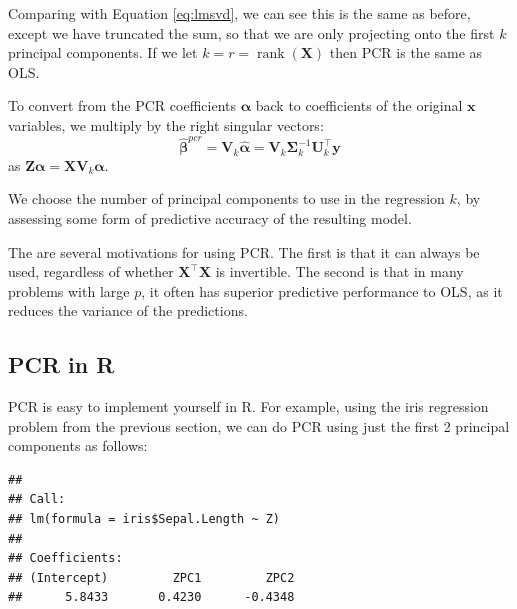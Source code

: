 \documentclass[
]{book}
\newenvironment{Shaded}{\begin{snugshade}}{\end{snugshade}}
\newcommand{\AttributeTok}[1]{\textcolor[rgb]{0.77,0.63,0.00}{#1}}
\newcommand{\CommentTok}[1]{\textcolor[rgb]{0.56,0.35,0.01}{\textit{#1}}}
\newcommand{\ConstantTok}[1]{\textcolor[rgb]{0.00,0.00,0.00}{#1}}
\newcommand{\DecValTok}[1]{\textcolor[rgb]{0.00,0.00,0.81}{#1}}
\newcommand{\FunctionTok}[1]{\textcolor[rgb]{0.00,0.00,0.00}{#1}}
\newcommand{\NormalTok}[1]{#1}
\newcommand{\OtherTok}[1]{\textcolor[rgb]{0.56,0.35,0.01}{#1}}
\newcommand{\SpecialCharTok}[1]{\textcolor[rgb]{0.00,0.00,0.00}{#1}}
\theoremstyle{definition}
\theoremstyle{definition}
\theoremstyle{definition}
\theoremstyle{definition}
\theoremstyle{remark}
\begin{document}
Comparing with Equation \eqref{eq:lmsvd}, we can see this is the same as before, except we have truncated the sum, so that we are only projecting onto the first \(k\) principal components. If we let \(k=r = \operatorname{rank}(\mathbf X)\) then PCR is the same as OLS.

To convert from the PCR coefficients \(\boldsymbol \alpha\) back to coefficients of the original \(\mathbf x\) variables, we multiply by the right singular vectors:
\[\hat{\boldsymbol \beta}^{pcr} = \mathbf V_k \hat{\boldsymbol \alpha} = \mathbf V_k \boldsymbol{\Sigma}_k^{-1} \mathbf U_k^\top \mathbf y\]
as \(\mathbf Z\boldsymbol \alpha= \mathbf X\mathbf V_k \boldsymbol \alpha\).

We choose the number of principal components to use in the regression \(k\), by assessing some form of predictive accuracy of the resulting model.

The are several motivations for using PCR. The first is that it can always be used, regardless of whether \(\mathbf X^\top\mathbf X\) is invertible. The second is that in many problems with large \(p\), it often has superior predictive performance to OLS, as it reduces the variance of the predictions.

\hypertarget{pcr-in-r}{%
\subsection{PCR in R}\label{pcr-in-r}}

PCR is easy to implement yourself in R. For example, using the iris regression problem from the previous section, we can do PCR using just the first 2 principal components as follows:

\begin{Shaded}
\end{Shaded}

\begin{verbatim}
## 
## Call:
## lm(formula = iris$Sepal.Length ~ Z)
## 
## Coefficients:
## (Intercept)         ZPC1         ZPC2  
##      5.8433       0.4230      -0.4348
\end{verbatim}
\end{document}

